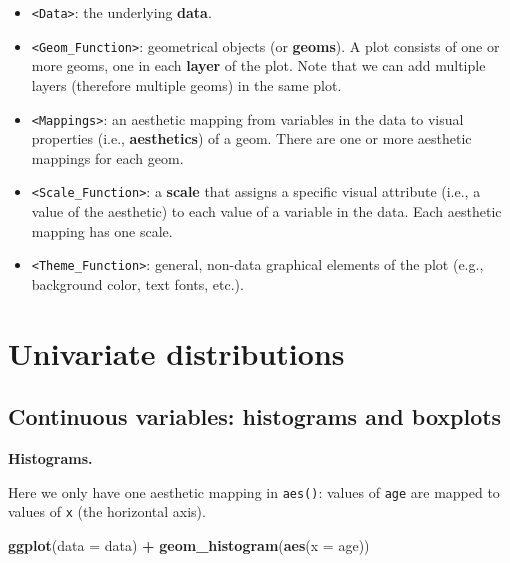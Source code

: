 \documentclass[
]{book}
\newenvironment{Shaded}{\begin{snugshade}}{\end{snugshade}}
\newcommand{\AttributeTok}[1]{\textcolor[rgb]{0.13,0.29,0.53}{#1}}
\newcommand{\FunctionTok}[1]{\textcolor[rgb]{0.13,0.29,0.53}{\textbf{#1}}}
\newcommand{\NormalTok}[1]{#1}
\newcommand{\SpecialCharTok}[1]{\textcolor[rgb]{0.81,0.36,0.00}{\textbf{#1}}}
\providecommand{\tightlist}{%
  \setlength{\itemsep}{0pt}\setlength{\parskip}{0pt}}
\begin{document}
\begin{itemize}
\tightlist
\item
  \texttt{\textless{}Data\textgreater{}}: the underlying \textbf{data}.
\item
  \texttt{\textless{}Geom\_Function\textgreater{}}: geometrical objects (or \textbf{geoms}). A plot consists of one or more geoms, one in each \textbf{layer} of the plot. Note that we can add multiple layers (therefore multiple geoms) in the same plot.
\item
  \texttt{\textless{}Mappings\textgreater{}}: an aesthetic mapping from variables in the data to visual properties (i.e., \textbf{aesthetics}) of a geom. There are one or more aesthetic mappings for each geom.
\item
  \texttt{\textless{}Scale\_Function\textgreater{}}: a \textbf{scale} that assigns a specific visual attribute (i.e., a value of the aesthetic) to each value of a variable in the data. Each aesthetic mapping has one scale.
\item
  \texttt{\textless{}Theme\_Function\textgreater{}}: general, non-data graphical elements of the plot (e.g., background color, text fonts, etc.).
\end{itemize}

\hypertarget{univariate-distributions}{%
\section{Univariate distributions}\label{univariate-distributions}}

\hypertarget{continuous-variables-histograms-and-boxplots}{%
\subsection{Continuous variables: histograms and boxplots}\label{continuous-variables-histograms-and-boxplots}}

\textbf{Histograms.}

Here we only have one aesthetic mapping in \texttt{aes()}: values of \texttt{age} are mapped to values of \texttt{x} (the horizontal axis).

\begin{Shaded}
\begin{Highlighting}[]
\FunctionTok{ggplot}\NormalTok{(}\AttributeTok{data =}\NormalTok{ data) }\SpecialCharTok{+}
  \FunctionTok{geom\_histogram}\NormalTok{(}\FunctionTok{aes}\NormalTok{(}\AttributeTok{x =}\NormalTok{ age))}
\end{Highlighting}
\end{Shaded}
\end{document}
